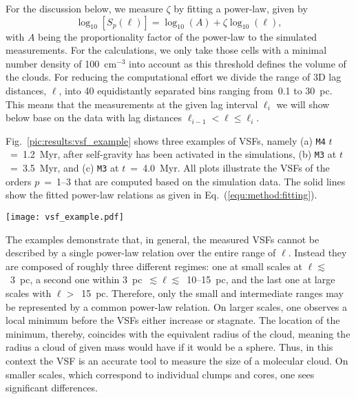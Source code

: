 For the discussion below, we measure $\zeta$ by fitting a power-law, given by
\begin{equation}
	\log_{10}\left[ S_p(\ell) \right] = \log_{10}\left(A\right) + \zeta \log_{10}(\ell) ,
    \label{equ:method:fitting}
\end{equation}
with $A$ being the proportionality factor of the power-law to the simulated measurements.
For the calculations, we only take those cells with a minimal number density of 100~cm$^{-3}$ into account as this threshold defines the volume of the clouds.
For reducing the computational effort we divide the range of 3D lag distances, $\ell$, into 40 equidistantly separated bins ranging from~0.1 to 30~pc.
This means that the measurements at the given lag interval $\ell_i$ we will show below base on the data with lag distances $\ell_{i-1} < \ell \leq \ell_i$.

Fig.~\ref{pic:results:vsf_example} shows three examples of VSFs, namely (a) \texttt{M4} $t$~=~1.2~Myr, after self-gravity has been activated in the simulations, (b) \texttt{M3} at $t$~=~3.5~Myr, and (c) \texttt{M3} at $t$~=~4.0~Myr.
All plots illustrate the VSFs of the orders $p$~=~1--3 that are computed based on the simulation data.
The solid lines show the fitted power-law relations as given in Eq.~(\ref{equ:method:fitting}).

\begin{figure*}[!htb]
	\centering
	\texttt{[image: vsf\_example.pdf]}
    \caption{Examples of velocity structure functions as function of the lag scale, $\ell$, and order, $p$. 
    	The dots (connected by dashed lines) illustrate the measured values based on the simulation data. 
        The solid lines represent the power-law relations fitted to the respective structure function.
	}
    \label{pic:results:vsf_example}
\end{figure*}

The examples demonstrate that, in general, the measured VSFs cannot be described by a single power-law relation over the entire range of $\ell$.
Instead they are composed of roughly three different regimes: 
one at small scales at $\ell \lesssim$~3~pc, a second one within 3~pc~$\lesssim \ell \lesssim$~10--15~pc, and the last one at large scales with $\ell >$~15~pc.
Therefore, only the small and intermediate ranges may be represented by a common power-law relation.
On larger scales, one observes a local minimum before the VSFs either increase or stagnate.
The location of the minimum, thereby, coincides with the equivalent radius of the cloud, meaning the radius a cloud of given mass would have if it would be a sphere.
Thus, in this context the VSF is an accurate tool to measure the size of a molecular cloud.
On smaller scales, which correspond to individual clumps and cores, one sees significant differences.


\endinput
